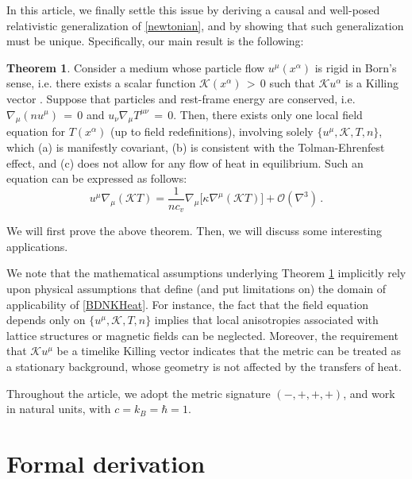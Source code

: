 \documentclass[a4paper, amsfonts, amssymb, amsmath, reprint, showkeys, nofootinbib, twoside, onecolumn,notitlepage]{revtex4-1}
\newcommand{\K}{{\mathcal{K}}}
\theoremstyle{definition}
\theoremstyle{theorem}
\newtheorem{theorem}{Theorem}
\begin{document}
In this article, we finally settle this issue by deriving a causal and well-posed relativistic generalization of \eqref{newtonian}, and by showing that such generalization must be unique. Specifically, our main result is the following:
\vspace{-0.1cm}
\begin{theorem}\label{theo1}
Consider a medium whose particle flow $u^\mu(x^\alpha)$ is rigid in Born's sense, i.e. there exists a scalar function $\K(x^\alpha)\,{>}\, 0$ such that $\K u^\alpha$ is a Killing vector \textup{\cite{Born1909,Herglotz1910,Noether1910}}. Suppose that particles and rest-frame energy are conserved, i.e. $\nabla_\mu (nu^\mu)\,{=}\,0$ and $u_\nu \nabla_\mu T^{\mu \nu}\,{=}\,0$. Then, there exists only one local field equation for $T(x^\alpha)$ (up to field redefinitions), involving solely $\{u^\mu,\K,T,n\}$, which \textup{(a)} is manifestly covariant, \textup{(b)} is consistent with the Tolman-Ehrenfest effect, and \textup{(c)} does not allow for any flow of heat in equilibrium. Such an equation can be expressed as follows:
\vspace{-0.15cm}
\begin{equation}\label{BDNKHeat}
\boxed{u^\mu \nabla_\mu (\K T) =\dfrac{1}{nc_v} \nabla_\mu \big[\kappa \nabla^\mu (\K T) \big] +\mathcal{O}(\nabla^3)  \, .}
\end{equation}
\end{theorem}

We will first prove the above theorem. Then, we will discuss some interesting applications.

{\color{black}We note that the mathematical assumptions underlying Theorem \ref{theo1} implicitly rely upon physical assumptions that define (and put limitations on) the domain of applicability of \eqref{BDNKHeat}. For instance, the fact that the field equation depends only on $\{u^\mu,\K,T,n\}$ implies that local anisotropies associated with lattice structures or magnetic fields can be neglected. Moreover, the requirement that $\K u^\mu$ be a timelike Killing vector indicates that the metric can be treated as a stationary background, whose geometry is not affected by the transfers of heat.}

Throughout the article, we adopt the metric signature $(-,+,+,+)$, and work in natural units, with $c=k_B=\hbar=1$. 


\section{Formal derivation}
\end{document}
